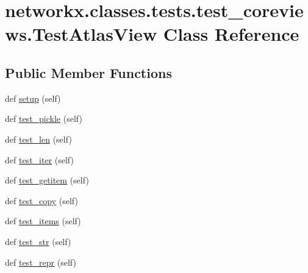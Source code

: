 \hypertarget{classnetworkx_1_1classes_1_1tests_1_1test__coreviews_1_1TestAtlasView}{}\section{networkx.\+classes.\+tests.\+test\+\_\+coreviews.\+Test\+Atlas\+View Class Reference}
\label{classnetworkx_1_1classes_1_1tests_1_1test__coreviews_1_1TestAtlasView}
\subsection*{Public Member Functions}
\begin{DoxyCompactItemize}
\item 
def \hyperlink{classnetworkx_1_1classes_1_1tests_1_1test__coreviews_1_1TestAtlasView_ae30f512517385ebf28eb2110a44aa899}{setup} (self)
\item 
def \hyperlink{classnetworkx_1_1classes_1_1tests_1_1test__coreviews_1_1TestAtlasView_a58e8ea75da5e9f7181b941dc30ed3eaf}{test\+\_\+pickle} (self)
\item 
def \hyperlink{classnetworkx_1_1classes_1_1tests_1_1test__coreviews_1_1TestAtlasView_a67f974f78a1d8dc32dcf0fa37ffdbb4f}{test\+\_\+len} (self)
\item 
def \hyperlink{classnetworkx_1_1classes_1_1tests_1_1test__coreviews_1_1TestAtlasView_af643fec41508ec5f00463d8722fb29d6}{test\+\_\+iter} (self)
\item 
def \hyperlink{classnetworkx_1_1classes_1_1tests_1_1test__coreviews_1_1TestAtlasView_a2c78ac4f0d7d772b2ddf79b99a682ad2}{test\+\_\+getitem} (self)
\item 
def \hyperlink{classnetworkx_1_1classes_1_1tests_1_1test__coreviews_1_1TestAtlasView_a84e292843258582546f33f465c2343bb}{test\+\_\+copy} (self)
\item 
def \hyperlink{classnetworkx_1_1classes_1_1tests_1_1test__coreviews_1_1TestAtlasView_a9c7c3ad44a6f0515d1f92c05e623700e}{test\+\_\+items} (self)
\item 
def \hyperlink{classnetworkx_1_1classes_1_1tests_1_1test__coreviews_1_1TestAtlasView_a3bb1eba5906fd50bf0eb807bcd436128}{test\+\_\+str} (self)
\item 
def \hyperlink{classnetworkx_1_1classes_1_1tests_1_1test__coreviews_1_1TestAtlasView_a99e31b5b2649863643f7d27fed39afec}{test\+\_\+repr} (self)
\end{DoxyCompactItemize}
